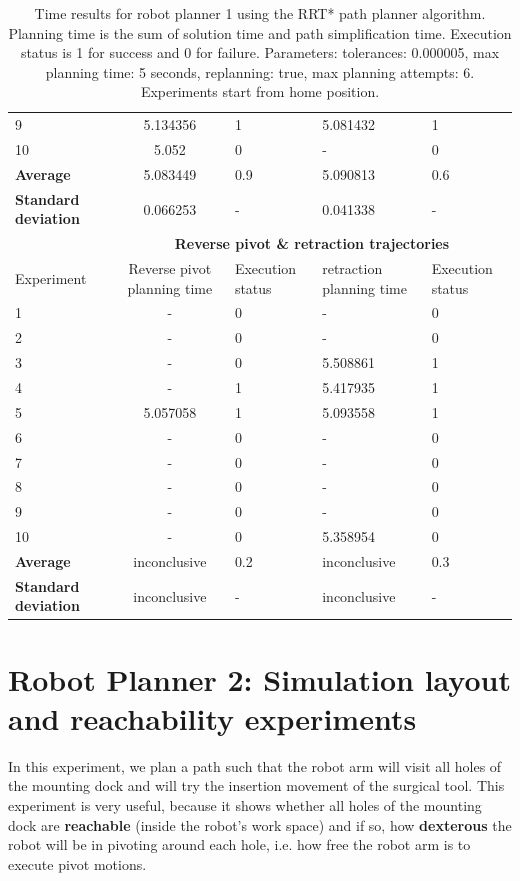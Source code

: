 \begin{table}[H]
\begin{tabular}{|p{2cm}|c|p{2cm}|p{2cm}|p{2cm}|}
9 & 5.134356  & 1 &  5.081432 &  1 \\
10  & 5.052 & 0  & - &  0 \\
\hline
\textbf{Average} & 	5.083449	& 0.9	& 5.090813	& 0.6 \\
\hline
\textbf{Standard deviation} & 	0.066253 &	- &	0.041338 & - \\
\hline
                          & \multicolumn{4}{c}{\textbf{Reverse pivot \& retraction trajectories}}                     \vline \\
\hline
Experiment                & Reverse pivot planning time & Execution status & retraction planning time & Execution status  \\
\hline
1 & -	& 0	& -	& 0 \\
2 & -	& 0	& -	& 0 \\
3 & -	& 0	& 5.508861	& 1 \\
4 & -	& 1	& 5.417935	& 1 \\
5 & 5.057058	& 1	& 5.093558	& 1 \\
6 & -	& 0	& -	& 0 \\
7 & -	& 0	& -	& 0 \\
8 & -	& 0	& -	& 0 \\
9 & -	& 0	& -	& 0 \\
10  & -	& 0	& 5.358954	& 0 \\
\hline
\textbf{Average} & inconclusive	& 0.2	& inconclusive	& 0.3 \\
\hline
\textbf{Standard deviation} & 	inconclusive &	- &	inconclusive & - \\
\hline
\end{tabular}
\caption{Time results for robot planner 1 using the RRT* path planner algorithm. Planning time is the sum of solution time and path simplification time. Execution status is 
1 for success and 0 for failure. Parameters: tolerances: 0.000005, max planning time: 5 seconds, replanning: true, max planning attempts: 6. Experiments start from home position.}
\label{robot-planner1-rrtstar-data}
\end{table}


\section{Robot Planner 2: Simulation layout and reachability experiments}
\label{section:robot-planner2}

In this experiment, we plan a path such that the robot arm will visit all holes of the mounting dock and will try the insertion movement of the surgical tool.
This experiment is very useful, because it shows whether all holes of the mounting dock are \textbf{reachable} (inside the robot's work space) and if so, how 
\textbf{dexterous} the robot will be in pivoting around each hole, i.e. how free the robot arm is to execute pivot motions.

